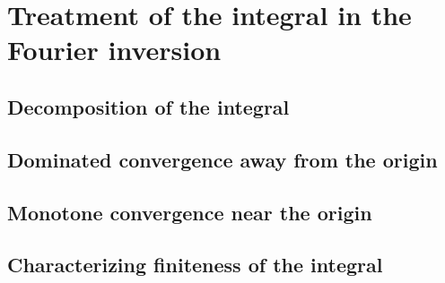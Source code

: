 \chapter{Treatment of the integral in the Fourier inversion}

\section{Decomposition of the integral}

\section{Dominated convergence away from the origin}

\section{Monotone convergence near the origin}

\section{Characterizing finiteness of the integral}
